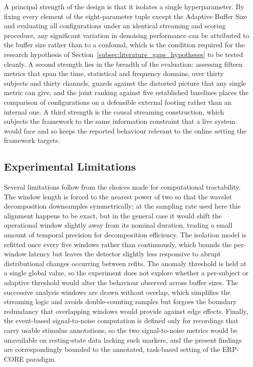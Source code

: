 \documentclass[MScCS,12pt,oneside,final]{uccthesis}
\begin{document}
A principal strength of the design is that it isolates a single hyperparameter. By fixing every element of the eight-parameter tuple except the Adaptive Buffer Size and evaluating all configurations under an identical streaming and scoring procedure, any significant variation in denoising performance can be attributed to the buffer size rather than to a confound, which is the condition required for the research hypothesis of Section~\ref{subsec:literature_gaps_hypotheses} to be tested cleanly. A second strength lies in the breadth of the evaluation: assessing fifteen metrics that span the time, statistical and frequency domains, over thirty subjects and thirty channels, guards against the distorted picture that any single metric can give, and the joint ranking against five established baselines places the comparison of configurations on a defensible external footing rather than an internal one. A third strength is the causal streaming construction, which subjects the framework to the same information constraint that a live system would face and so keeps the reported behaviour relevant to the online setting the framework targets.

\subsection{Experimental Limitations}
\label{subsec:experimental_limitations}
 
Several limitations follow from the choices made for computational tractability. The window length is forced to the nearest power of two so that the wavelet decomposition downsamples symmetrically; at the sampling rate used here this alignment happens to be exact, but in the general case it would shift the operational window slightly away from its nominal duration, trading a small amount of temporal precision for decomposition efficiency. The isolation model is refitted once every five windows rather than continuously, which bounds the per-window latency but leaves the detector slightly less responsive to abrupt distributional changes occurring between refits. The anomaly threshold is held at a single global value, so the experiment does not explore whether a per-subject or adaptive threshold would alter the behaviour observed across buffer sizes. The successive analysis windows are drawn without overlap, which simplifies the streaming logic and avoids double-counting samples but forgoes the boundary redundancy that overlapping windows would provide against edge effects. Finally, the event-based signal-to-noise computation is defined only for recordings that carry usable stimulus annotations, so the two signal-to-noise metrics would be unavailable on resting-state data lacking such markers, and the present findings are correspondingly bounded to the annotated, task-based setting of the ERP-CORE paradigm.
\end{document}
